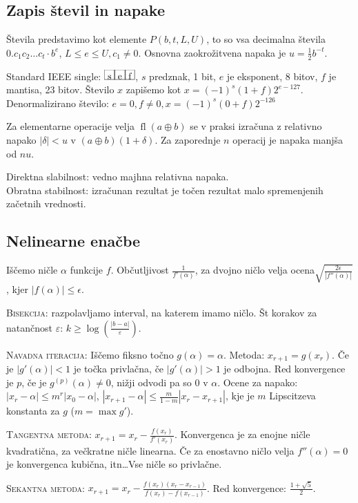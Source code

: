 \documentclass[a4paper,10pt]{article}
\title{\mytitle}
\author{Jure Slak}
\date{\today}
\theoremstyle{definition}
\newcommand{\mybox}[1]{\frame{\rule{0pt}{10pt}\ #1\ }}
\begin{document}
\subsection*{Zapis števil in napake}
Števila predstavimo kot elemente $P(b, t, L, U)$, to so vsa decimalna števila
$0.c_1c_2\ldots c_t \cdot b^e$, $L \leq e \leq U, c_1 \neq 0$. Osnovna zaokrožitvena
 napaka je $u = \frac12b^{-t}$.

Standard IEEE single: $\mybox{s}\mybox{e}\mybox{f}$, $s$ predznak, 1 bit, $e$ je eksponent,
8 bitov, $f$ je mantisa, 23 bitov. Število $x$ zapišemo kot $x = (-1)^s(1+f)2^{e-127}$.
Denormalizirano število: $e = 0, f \neq 0, x = (-1)^s(0+f)2^{-126}$

Za elementarne operacije velja $\operatorname{fl}(a \oplus b)$ se v praksi izračuna
z relativno napako $|\delta| < u$ v $(a \oplus b)(1+\delta)$. Za zaporednje $n$ operacij
je napaka manjša od $nu$.

Direktna slabilnost: vedno majhna relativna napaka. \\
Obratna stabilnost: izračunan rezultat je točen rezultat malo spremenjenih začetnih vrednosti.

\subsection*{Nelinearne enačbe}
Iščemo ničle $\alpha$ funkcije $f$. Občutljivost $\frac{1}{f'(\alpha)}$, za
dvojno ničlo velja ocena$\sqrt{\frac{2 \epsilon}{|f''(\alpha)|}}$, kjer $|f(\alpha)| \leq \epsilon$.

\textsc{Bisekcija:} razpolavljamo interval, na katerem imamo ničlo. Št korakov za
natančnost $\varepsilon$: $k \geq \log\left(\frac{|b-a|}{\varepsilon}\right)$.

\textsc{Navadna iteracija:} Iščemo fiksno točno $g(\alpha) = \alpha$. Metoda: $x_{r+1} =
g(x_r)$. Če je $|g'(\alpha)| < 1$ je točka privlačna, če $|g'(\alpha)| > 1$ je
odbojna. Red konvergence je $p$, če je $g^{(p)}(\alpha) \neq 0$, nižji odvodi pa so $0$ v $\alpha$. Ocene za napako:
$|x_r - \alpha| \leq m^r|x_0 - \alpha|$, $|x_{r+1} - \alpha|  \leq \frac{m}{1-m} |x_r - x_{r+1}|$, kje je $m$ Lipscitzeva
konstanta za $g$ ($m = \max g'$).

\textsc{Tangentna metoda:} $x_{r+1} = x_r - \frac{f(x_r)}{f'(x_r)}$. Konvergenca je za
enojne ničle kvadratična, za večkratne ničle linearna. Če za enostavno ničlo
velja $f''(\alpha) = 0$ je konvergenca kubična, itn\dots Vse ničle so privlačne.

\textsc{Sekantna metoda:} $x_{r+1} = x_r - \frac{f(x_r)(x_r - x_{r-1})}{f(x_r) -
f(x_{r-1})}$. Red konvergence: $\frac{1+\sqrt{5}}{2}$.
\end{document}

